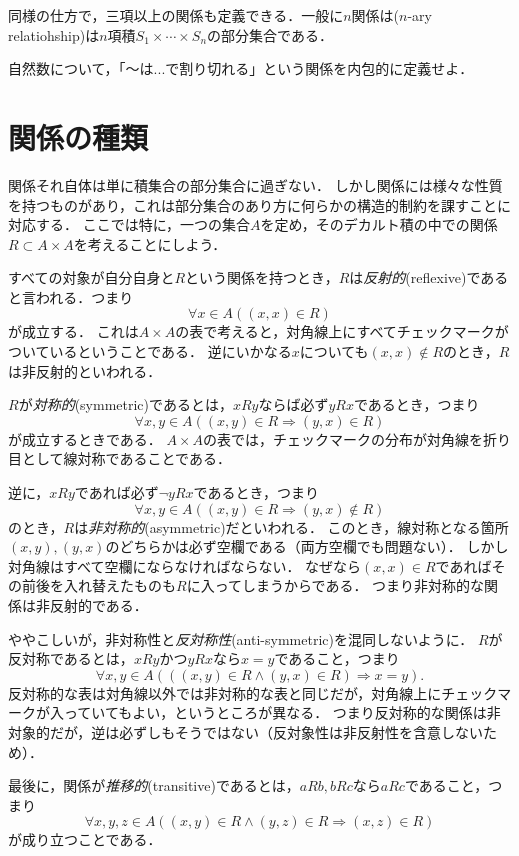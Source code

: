 \documentclass[11pt,a4paper]{jsarticle} %
\begin{document}
同様の仕方で，三項以上の関係も定義できる．一般に$n$関係は($n$-ary relatiohship)は$n$項積$S_1 \times \cdots \times S_n$の部分集合である．

\begin{exercise}
自然数について，「〜は...で割り切れる」という関係を内包的に定義せよ．
\end{exercise}


\section{関係の種類}
\label{sec:relation_kinds}
関係それ自体は単に積集合の部分集合に過ぎない．
しかし関係には様々な性質を持つものがあり，これは部分集合のあり方に何らかの構造的制約を課すことに対応する．
ここでは特に，一つの集合$A$を定め，そのデカルト積の中での関係$R \subset A \times A$を考えることにしよう．

すべての対象が自分自身と$R$という関係を持つとき，$R$は\emph{反射的}(reflexive)であると言われる．つまり
\[
 \forall x \in A ( (x,x) \in R )
\]
が成立する．
これは$A \times A$の表で考えると，対角線上にすべてチェックマークがついているということである．
逆にいかなる$x$についても$(x, x) \not\in R$のとき，$R$は非反射的といわれる．

$R$が\emph{対称的}(symmetric)であるとは，$xRy$ならば必ず$yRx$であるとき，つまり
\[
 \forall x, y \in A ( (x,y) \in R \Rightarrow (y,x) \in R)
\]
が成立するときである．
$A \times A$の表では，チェックマークの分布が対角線を折り目として線対称であることである．

逆に，$xRy$であれば必ず$\neg yRx$であるとき，つまり
\[
 \forall x, y \in A ( (x,y) \in R \Rightarrow (y,x) \not\in R)
\]
のとき，$R$は\emph{非対称的}(asymmetric)だといわれる．
このとき，線対称となる箇所$(x,y), (y,x)$のどちらかは必ず空欄である（両方空欄でも問題ない）．
しかし対角線はすべて空欄にならなければならない．
なぜなら$(x,x) \in R$であればその前後を入れ替えたものも$R$に入ってしまうからである．
つまり非対称的な関係は非反射的である．

ややこしいが，非対称性と\emph{反対称性}(anti-symmetric)を混同しないように．
$R$が反対称であるとは，$xRy$かつ$yRx$なら$x=y$であること，つまり
\[
 \forall x, y \in A ( ((x,y) \in R \wedge  (y,x) \in R) \Rightarrow x=y).
\]
反対称的な表は対角線以外では非対称的な表と同じだが，対角線上にチェックマークが入っていてもよい，というところが異なる．
つまり反対称的な関係は非対象的だが，逆は必ずしもそうではない（反対象性は非反射性を含意しないため）．

最後に，関係が\emph{推移的}(transitive)であるとは，$aRb, bRc$なら$aRc$であること，つまり
\[
 \forall x, y, z \in A ((x,y) \in R \wedge (y,z) \in R \Rightarrow (x,z) \in R)
\]
が成り立つことである．
\end{document}
